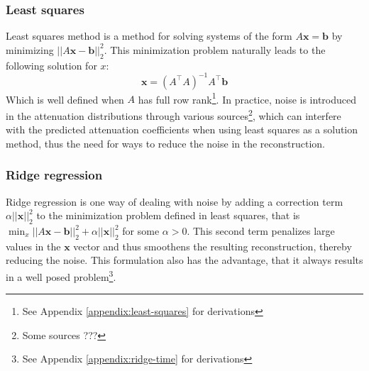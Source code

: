 \documentclass{article}
\begin{document}
\subsubsection{Least squares}\label{sec:least-squares-text} 
Least squares method is a method for solving systems of the form $A\mathbf{x} = \mathbf{b}$ by minimizing $||A\mathbf{x} - \mathbf{b}||_{2}^{2}$. This minimization problem naturally leads to the following solution for $x$:
\begin{equation}
    \mathbf{x} = (A^\intercal A)^{-1} A^\intercal \mathbf{b}
\end{equation}
Which is well defined when $A$ has full row rank\footnote{See Appendix \ref{appendix:least-squares} for derivations}. In practice, noise is introduced in the attenuation distributions through various sources\footnote{Some sources ???}, which can interfere with the predicted attenuation coefficients when using least squares as a solution method, thus the need for ways to reduce the noise in the reconstruction.

\subsubsection{Ridge regression}\label{sec:ridgre-regression-text}
Ridge regression is one way of dealing with noise by adding a correction term $\alpha ||\mathbf{x}||_2^2$ to the minimization problem defined in least squares, that is $\min_x ||A\mathbf{x} - \mathbf{b}||_2^2 + \alpha ||\mathbf{x}||_2^2$ for some $\alpha > 0$. This second term penalizes large values in the $\mathbf{x}$ vector and thus smoothens the resulting reconstruction, thereby reducing the noise. This formulation also has the advantage, that it always results in a well posed problem\footnote{See Appendix \ref{appendix:ridge-time} for derivations}.

\end{document}
